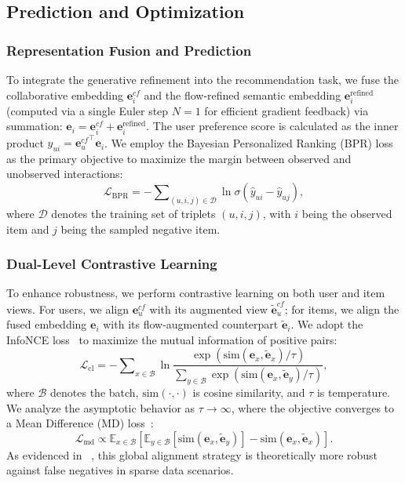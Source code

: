 \subsection{Prediction and Optimization}

\subsubsection{\textbf{Representation Fusion and Prediction}}
To integrate the generative refinement into the recommendation task, we fuse the collaborative embedding $\mathbf{e}_i^{cf}$ and the flow-refined semantic embedding $\mathbf{e}_i^{\text{refined}}$ (computed via a single Euler step $N=1$ for efficient gradient feedback) via summation: $\mathbf{e}_i = \mathbf{e}_i^{cf} + \mathbf{e}_i^{\text{refined}}$.
The user preference score is calculated as the inner product $\hat{y}_{ui} = {\mathbf{e}_u^{cf}}^\top \mathbf{e}_i$.
We employ the Bayesian Personalized Ranking (BPR) loss~\cite{rendle2012bpr} as the primary objective to maximize the margin between observed and unobserved interactions:
\begin{equation}
	\mathcal{L}_{\text{BPR}} = - \sum\nolimits_{(u, i, j) \in \mathcal{D}} \ln \sigma(\hat{y}_{ui} - \hat{y}_{uj}),
\end{equation}
where $\mathcal{D}$ denotes the training set of triplets $(u, i, j)$, with $i$ being the observed item and $j$ being the sampled negative item.

\subsubsection{\textbf{Dual-Level Contrastive Learning}}
To enhance robustness, we perform contrastive learning on both user and item views.
For users, we align $\mathbf{e}_u^{cf}$ with its augmented view $\tilde{\mathbf{e}}_u^{cf}$; for items, we align the fused embedding $\mathbf{e}_i$ with its flow-augmented counterpart $\tilde{\mathbf{e}}_i$.  
We adopt the InfoNCE loss~\cite{oord2018representation} to maximize the mutual information of positive pairs:
\begin{equation}
	\mathcal{L}_{\text{cl}} = - \sum\nolimits_{x \in \mathcal{B}} \ln \frac{\exp(\text{sim}(\mathbf{e}_x, \tilde{\mathbf{e}}_x) / \tau)}{\sum_{y \in \mathcal{B}} \exp(\text{sim}(\mathbf{e}_x, \tilde{\mathbf{e}}_y) / \tau)},
\end{equation}
where $\mathcal{B}$ denotes the batch, $\text{sim}(\cdot, \cdot)$ is cosine similarity, and $\tau$ is temperature. We analyze the asymptotic behavior as \(\tau \to \infty\), where the objective converges to a Mean Difference (MD) loss~\cite{wang2021understanding}:
\begin{equation}
	\label{eq:md_loss}
	\mathcal{L}_{\text{md}} \propto \mathbb{E}_{x \in \mathcal{B}} \left[ \mathbb{E}_{y \in \mathcal{B}} [\text{sim}(\mathbf{e}_x, \tilde{\mathbf{e}}_y)] - \text{sim}(\mathbf{e}_x, \tilde{\mathbf{e}}_x) \right].
\end{equation}
As evidenced in ~\cite{wang2021understanding}, this global alignment strategy is theoretically more robust against false negatives in sparse data scenarios.

